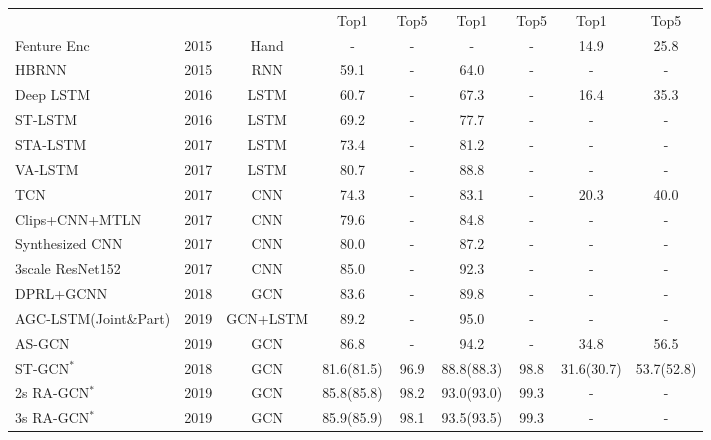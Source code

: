 \documentclass[runningheads]{llncs}
\begin{document}
\begin{table*}[h]
{\begin{tabular}{l c c c c c c c c}
		\\ \cmidrule(rl){4-5} \cmidrule(rl){6-7} \cmidrule(l){8-9}& 
		& & Top1  & Top5  & Top1  & Top5 & Top1  & Top5   \\
		\cmidrule(l){1-9}
        \multicolumn{1}{l}{Fenture Enc \cite{fernando2015modeling}} & 2015&Hand  & - & - & - & - & 14.9 & 25.8  \\
        \hline
		\multicolumn{1}{l}{HBRNN \cite{du2015hierarchical}}  &2015  & RNN & 59.1 & - & 64.0 &- &- &- \\
		\multicolumn{1}{l}{Deep LSTM \cite{shahroudy2016ntu}}&2016 & LSTM & 60.7 & - & 67.3 &- & 16.4 & 35.3\\
		\multicolumn{1}{l}{ST-LSTM \cite{liu2016spatio}}  &2016    & LSTM & 69.2 & - & 77.7 &- &- &- \\
		\multicolumn{1}{l}{STA-LSTM \cite{song2017end}}  &2017     & LSTM & 73.4 & - & 81.2 &- &- &- \\
		\multicolumn{1}{l}{VA-LSTM \cite{zhang2017view}} &2017     & LSTM & 80.7 & - & 88.8 &- &- &- \\
		\midrule
		\multicolumn{1}{l}{TCN \cite{kim2017interpretable}}  &2017   & CNN & 74.3 & - & 83.1 &-& 20.3 & 40.0 \\
		\multicolumn{1}{l}{Clips+CNN+MTLN \cite{ke2017new}} & 2017&  CNN & 79.6&- & 84.8  &- &  - &- \\
		\multicolumn{1}{l}{Synthesized CNN \cite{liu2017enhanced}}& 2017 & CNN &  80.0 &- & 87.2&-  &- &- \\
		\multicolumn{1}{l}{3scale ResNet152 \cite{li2017skeleton}} & 2017& CNN & 85.0 & - &  92.3  &-  &- &- \\
 	    \midrule
 		\multicolumn{1}{l}{DPRL+GCNN \cite{tang2018deep}} & 2018 &GCN &        83.6   &-   & 89.8 & - &-   &- \\
	    \multicolumn{1}{l}{AGC-LSTM(Joint\&Part) \cite{si2019attention}} & 2019 &GCN+LSTM &89.2 &- &95.0 &- &-&-  \\
		\multicolumn{1}{l}{AS-GCN \cite{li2019actional}}& 2019  &GCN &     86.8  & -   &   94.2  & -   & 34.8 & 56.5   \\
		\multicolumn{1}{l}{ST-GCN$^{*}$ \cite{yan2018spatial}}& 2018  & GCN & 81.6(81.5) & 96.9 & 88.8(88.3)& 98.8 & 31.6(30.7) &53.7(52.8) \\
		\multicolumn{1}{l}{2s RA-GCN$^{*}$ \cite{song2019richly}}& 2019 & GCN &  85.8(85.8) & 98.2 & 93.0(93.0) & 99.3  & - &- \\
		\multicolumn{1}{l}{3s RA-GCN$^{*}$ \cite{song2019richly}}& 2019 & GCN &  85.9(85.9) & 98.1 & 93.5(93.5) & 99.3  & - &- \\

\end{tabular}}
\end{table*}
\end{document}
